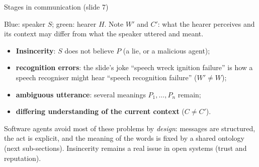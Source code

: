\begin{nbfact}{Stages in communication (slide 7)}
\begin{center}
\end{center}
Blue: speaker $S$; green: hearer $H$. Note $W'$ and $C'$: what the hearer perceives and its
context may differ from what the speaker uttered and meant.
\end{nbfact}

\begin{nbwarning}
\begin{itemize}[nosep]
  \item \textbf{Insincerity}: $S$ does not believe $P$ (a lie, or a malicious agent);
  \item \textbf{recognition errors}: the slide's joke ``speech wreck ignition failure'' is
        how a speech recogniser might hear ``speech recognition failure'' ($W' \neq W$);
  \item \textbf{ambiguous utterance}: several meanings $P_1, \ldots, P_n$ remain;
  \item \textbf{differing understanding of the current context} ($C \neq C'$).
\end{itemize}
Software agents avoid most of these problems by \emph{design}: messages are structured, the
act is explicit, and the meaning of the words is fixed by a shared ontology (next
sub-sections). Insincerity remains a real issue in open systems (trust and reputation).
\end{nbwarning}

